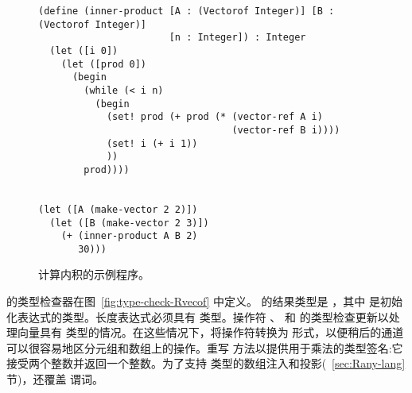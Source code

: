 \documentclass[11pt]{book}
\begin{document}
\begin{figure}[tp]
\begin{lstlisting}
(define (inner-product [A : (Vectorof Integer)] [B : (Vectorof Integer)]
                       [n : Integer]) : Integer
  (let ([i 0])
    (let ([prod 0])
      (begin
        (while (< i n)
          (begin
            (set! prod (+ prod (* (vector-ref A i)
                                  (vector-ref B i))))
            (set! i (+ i 1))
            ))
        prod))))
  

(let ([A (make-vector 2 2)])
  (let ([B (make-vector 2 3)])
    (+ (inner-product A B 2)
       30)))
\end{lstlisting}
\caption{计算内积的示例程序。}
\label{fig:inner-product}
\end{figure}


 \LangArray{} 的类型检查器在图~\ref{fig:type-check-Rvecof} 中定义。
 的结果类型是  ，其中  是初始化表达式的类型。长度表达式必须具有  类型。操作符
 、  和   的类型检查更新以处理向量具有
 类型的情况。在这些情况下，将操作符转换为
 形式，以便稍后的通道可以很容易地区分元组和数组上的操作。重写
 方法以提供用于乘法的类型签名:它接受两个整数并返回一个整数。为了支持  类型的数组注入和投影(~\ref{sec:Rany-lang} 节)，还覆盖  谓词。
\end{document}
